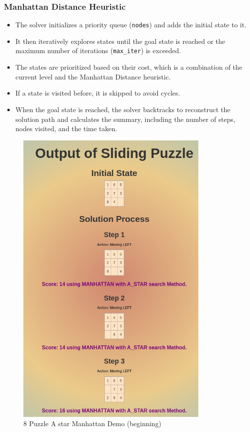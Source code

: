 \documentclass[12pt]{article}
\begin{document}
\subsubsection*{Manhattan Distance Heuristic}
\begin{itemize}
    \item The solver initializes a priority queue (\texttt{nodes}) and adds the initial state to it.
    \item It then iteratively explores states until the goal state is reached or the maximum number of iterations (\texttt{max\_iter}) is exceeded.
    \item The states are prioritized based on their cost, which is a combination of the current level and the Manhattan Distance heuristic.
    \item If a state is visited before, it is skipped to avoid cycles.
    \item When the goal state is reached, the solver backtracks to reconstruct the solution path and calculates the summary, including the number of steps, nodes visited, and the time taken.
\end{itemize}
\clearpage
\begin{figure}[h]
  \centerline{\includegraphics[height = 150mm]{Sliding_Output_M_A_1.png}}
  \caption{8 Puzzle A star Manhattan Demo (beginning)}
  \label{fig}
\end{figure}
\end{document}
